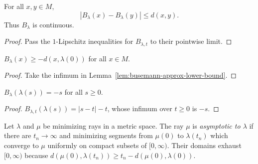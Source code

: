\begin{lemma}
\label{lem:busemann-lipschitz}
\leanok



For all $x,y\in M$,
$$|B_\lambda(x)-B_\lambda(y)|\le d(x,y).$$
Thus $B_\lambda$ is continuous.
\end{lemma}
\begin{proof}
\sketch
\leanok
{}
Pass the $1$-Lipschitz inequalities for $B_{\lambda,t}$ to their
pointwise limit.
\end{proof}

\begin{lemma}
\label{lem:busemann-lower-bound}
\leanok



$B_\lambda(x)\ge-d(x,\lambda(0))$ for all $x\in M$.
\end{lemma}
\begin{proof}
\sketch
\leanok
{}
Take the infimum in Lemma~\ref{lem:busemann-approx-lower-bound}.
\end{proof}

\begin{lemma}
\label{lem:busemann-along-ray}
\leanok



$B_\lambda(\lambda(s))=-s$ for all $s\ge0$.
\end{lemma}
\begin{proof}
\sketch
\leanok
$B_{\lambda,t}(\lambda(s))=|s-t|-t$, whose infimum over $t\ge0$ is
$-s$.
\end{proof}

\begin{definition}
\label{def:asymptotic-ray}
\leanok




Let $\lambda$ and $\mu$ be minimizing rays in a metric space. The ray
$\mu$ is \emph{asymptotic to $\lambda$} if there are $t_n\to\infty$
and minimizing segments from $\mu(0)$ to $\lambda(t_n)$ which converge
to $\mu$ uniformly on compact subsets of $[0,\infty)$. Their domains
exhaust $[0,\infty)$ because
$d(\mu(0),\lambda(t_n))\ge t_n-d(\mu(0),\lambda(0))$.
\end{definition}

